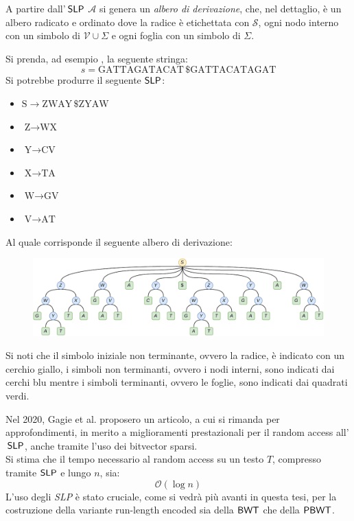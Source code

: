 A partire dall'$\,\mbox{\rm {\sf SLP}}$ $\mathcal{A}$ si genera un \textit{albero
  di derivazione}, che, nel dettaglio, è un albero radicato e ordinato
dove la radice è etichettata con $\mathcal{S}$, ogni nodo
interno con un simbolo di $\mathcal{V}\cup\Sigma$ e ogni foglia
con un simbolo di $\Sigma$.
\begin{esempio}
  \label{ese:slpgagie}
  Si prenda, ad esempio \cite{slpgagie}, la seguente stringa:
  \[s=\mbox{GATTAGATACAT}\,\$\mbox{GATTACATAGAT}\]
  Si potrebbe produrre il seguente $\mbox{\rm {\sf SLP}}$:
  \begin{multicols}{3}
    \begin{itemize}
      \item $\mbox{S}\to \mbox{ZWAY}\,\$\mbox{ZYAW}$
      \item $\mbox{Z}\to \mbox{WX}$
      \item $\mbox{Y}\to \mbox{CV}$
      \item $\mbox{X}\to \mbox{TA}$
      \item $\mbox{W}\to \mbox{GV}$
      \item $\mbox{V}\to \mbox{AT}$
    \end{itemize}
  \end{multicols}
  Al quale corrisponde il seguente albero di derivazione:
  \begin{figure}[H]
    \centering
    \includegraphics[width=\textwidth]{img/slpgagie.pdf}
  \end{figure}
  Si noti che il simbolo
  iniziale non terminante, ovvero la radice, è indicato con un cerchio giallo, i
  simboli non terminanti, ovvero i nodi interni, sono indicati dai cerchi blu
  mentre i simboli terminanti, ovvero le foglie, sono indicati dai quadrati
  verdi.
\end{esempio}
Nel 2020, Gagie et al. \cite{slpgagie} 
proposero un articolo, a cui si rimanda per approfondimenti, in merito a
miglioramenti prestazionali per il random access all'$\,\mbox{\rm {\sf SLP}}$,
anche tramite l'uso dei bitvector sparsi.\\
Si stima che il tempo necessario al random access su un testo $T$, compresso
tramite $\mbox{\rm {\sf SLP}}$ e lungo $n$, sia: 
\begin{equation}
  \label{eq:slptime}
  \mathcal{O}\left(\log n\right)
\end{equation}
L'uso degli \textit{SLP} è stato cruciale, come si vedrà più
avanti in questa tesi, per la costruzione della variante run-length encoded sia
della $\mbox{\rm {\sf BWT}}$ che della $\mbox{\rm {\sf PBWT}}$.
